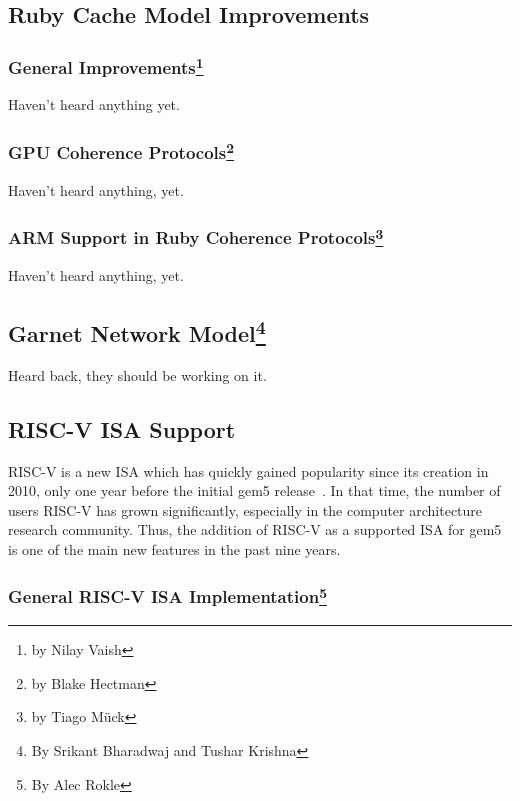 \subsection[Ruby Cache Model Improvements]{Ruby Cache Model Improvements}

\subsubsection[General Improvements]{General Improvements\footnote{by Nilay Vaish}}

Haven't heard anything yet.

\subsubsection[GPU Coherence Protocols]{GPU Coherence Protocols\footnote{by Blake Hectman}}

Haven't heard anything, yet.

\subsubsection[ARM Support and Extensions]{ARM Support in Ruby Coherence Protocols\footnote{by Tiago M{\"u}ck}}

Haven't heard anything, yet.

\subsection[Garnet Network Model]{Garnet Network Model\footnote{By Srikant Bharadwaj and Tushar Krishna}}

Heard back, they should be working on it.

\subsection[RISC-V ISA Support]{RISC-V ISA Support}

RISC-V is a new ISA which has quickly gained popularity since its creation in 2010, only one year before the initial gem5 release~\cite{Waterman2011riscv}.
In that time, the number of users RISC-V has grown significantly, especially in the computer architecture research community.
Thus, the addition of RISC-V as a supported ISA for gem5 is one of the main new features in the past nine years.

\subsubsection[General RISC-V ISA Implementation]{General RISC-V ISA Implementation\footnote{By Alec Rokle}}

